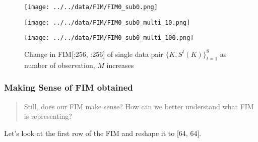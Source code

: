 \documentclass[
]{article}
\begin{document}
\begin{figure}

\begin{minipage}{0.33\linewidth}

\texttt{[image: ../../data/FIM/FIM0\_sub0.png]}

\end{minipage}%
%
\begin{minipage}{0.33\linewidth}

\texttt{[image: ../../data/FIM/FIM0\_sub0\_multi\_10.png]}

\end{minipage}%
%
\begin{minipage}{0.33\linewidth}

\texttt{[image: ../../data/FIM/FIM0\_sub0\_multi\_100.png]}

\end{minipage}%

\caption{\label{fig-fim}Change in FIM{[}:256, :256{]} of single data
pair \(\{K, S^t(K)\}^8_{t=1}\) as number of observation, \(M\)
increases}

\end{figure}%

\subsubsection{Making Sense of FIM
obtained}\label{making-sense-of-fim-obtained}

\begin{quote}
Still, does our FIM make sense? How can we better understand what FIM is
representing?
\end{quote}

Let's look at the first row of the FIM and reshape it to {[}64, 64{]}.
\end{document}

